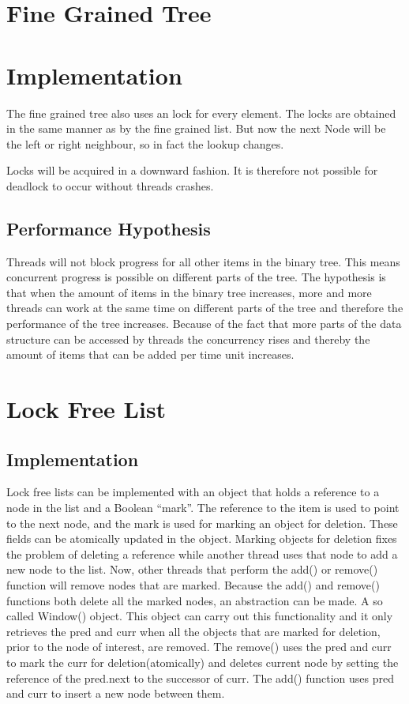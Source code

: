 \documentclass[10pt,a4paper]{article}
\begin{document}
\section{Fine Grained Tree} 
\section{Implementation}
The fine grained tree also uses an lock for every
element.  The locks are obtained in the same manner as by the fine grained
list. But now the next Node will be the left or right neighbour, so in fact the
lookup changes. 

Locks will be acquired in a downward fashion. It is therefore not possible for
deadlock to occur without threads crashes.

\subsection{Performance Hypothesis}
Threads will not block progress for all
other items in the binary tree. This means concurrent progress is possible on
different parts of the tree.  The hypothesis is that when the amount of items
in the binary tree increases, more and more threads can work at the same time
on different parts of the tree and therefore the performance of the tree
increases. Because of the fact that more parts of the data structure can be
accessed by threads the concurrency rises and thereby the amount of items that
can be added per time unit increases.


\section{Lock Free List}
\subsection{Implementation}
Lock free lists can be implemented with an object that holds a reference to a node in the list and a
Boolean ``mark''. The reference to the item is used to point to the next node,
and the mark is used for marking an object for deletion. These fields can be
atomically updated in the object. Marking objects for deletion fixes the
problem of deleting a reference while another thread uses that node to add a
new node to the list. Now, other threads that perform the add() or remove()
function will remove nodes that are marked. Because the add() and remove()
functions both delete all the marked nodes, an abstraction can be made. A so
called Window() object. This object can carry out this functionality and it
only retrieves the pred and curr when all the objects that are marked for
deletion, prior to the node of interest, are removed. The remove() uses the
pred and curr to mark the curr for deletion(atomically) and deletes current
node by setting the reference of the pred.next to the successor of curr. The
add() function uses pred and curr to insert a new node between them.
\end{document}
